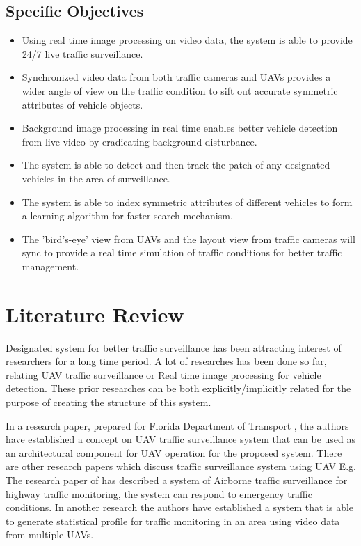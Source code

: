 \documentclass[12pt,a4paper,oneside]{article}
\begin{document}
\subsection{Specific Objectives}
\begin{itemize}
\item Using real time image processing on video data, the system is able to provide 24/7 live traffic surveillance.

\item Synchronized video data from both traffic cameras and UAVs provides a wider angle of view on the traffic condition to sift out accurate symmetric attributes of vehicle objects. 

\item Background image processing in real time enables better vehicle detection from live video by eradicating background disturbance.

\item The  system is able to detect and then track the patch of any designated vehicles in the area of surveillance. 

\item The system is able to index symmetric attributes of different vehicles to form a learning algorithm for faster search mechanism.

\item The 'bird's-eye' view from UAVs and the layout view from traffic cameras will sync to provide a real time simulation of traffic conditions for better traffic management.
\end{itemize}

\newpage
\null
\section{Literature Review}

Designated system for better traffic surveillance has been attracting interest of researchers for a long time period. A lot of researches has been done so far, relating UAV traffic surveillance or Real time image processing for vehicle detection. These prior researches can be both explicitly/implicitly related for the purpose of creating the structure of this system. 

In a research paper, prepared for Florida Department of Transport \cite{farradine2005use} , the authors have established a concept on UAV traffic surveillance system that can be used as an architectural component for UAV operation for the proposed system. There are other research papers which discuss traffic surveillance system using UAV E.g. The research paper of \cite{srinivasan2004airborne} has described a system of Airborne traffic surveillance for highway traffic monitoring, the system can respond to emergency traffic conditions. In another research \cite{puri2007statistical} the authors have established a system that is able to generate statistical profile for traffic monitoring in an area using video data from multiple UAVs. 
\end{document}
